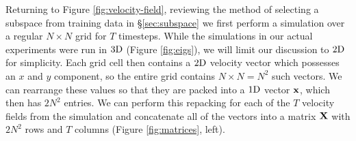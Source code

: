 


Returning to Figure \ref{fig:velocity-field}, reviewing the method of selecting a subspace from training data in \S \ref{sec:subspace} we first perform a simulation over a regular $N \times N$ grid for $T$ timesteps. While the simulations in our actual experiments were run in $3\textnormal{D}$ (Figure \ref{fig:eigs}), we will limit our discussion to $2\textnormal{D}$ for simplicity. Each grid cell then contains a $2\textnormal{D}$ velocity vector which possesses an $x$ and $y$ component, so the entire grid contains $N \times N = N^2$ such vectors. We can rearrange these values so that they are packed into a $1\textnormal{D}$ vector $\mathbf{x}$, which then has $2N^2$ entries. We can perform this repacking for each of the $T$ velocity fields from the simulation and concatenate all of the vectors into a matrix $\mathbf{X}$ with $2N^2$ rows and $T$ columns (Figure \ref{fig:matrices}, left).

